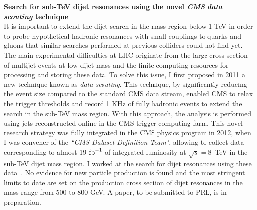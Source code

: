 \documentclass[10pt, a4paper]{article}
\begin{document}
{\bf Search for sub-TeV dijet resonances using the novel {\it CMS data scouting} technique}\\[0.5em]
It is important to extend the dijet search in the
mass region below 1 TeV in order to probe hypothetical hadronic resonances with small
couplings to quarks and gluons that similar searches performed at previous
colliders could not find yet. The main experimental difficulties at LHC originate
from the large cross section of multijet events at low dijet mass 
and the finite computing resources for processing and storing these
data. To solve this issue, I first proposed in 2011 a new technique known as 
{\it data scouting}. This technique, by significantly reducing the event size
compared to the standard CMS data stream, enabled CMS to relax the
trigger thresholds and record 1 KHz of fully hadronic events to extend
the search in the sub-TeV mass region. With this approach, the
analysis is performed using jets reconstructed online in the CMS
trigger computing farm. 
This novel research strategy was fully integrated in the CMS physics program in
2012, when I was convener of the {\it``CMS Dataset Definition Team"}, 
allowing to collect data corresponding to almost 19 $\rm{fb}^{-1}$ of
integrated luminosity at $\sqrt{s}=8$~TeV in the sub-TeV dijet mass region. 
I worked at the search for dijet resonances using these data~\cite{CMS:2015neg}.  
No evidence for new particle production is found and the most
stringent limits to date are set on the production cross section of dijet resonances
in the mass range from 500 to 800 GeV. A paper, to be submitted to PRL, is 
in preparation. \\ [1em]

\clearpage
\end{document}
